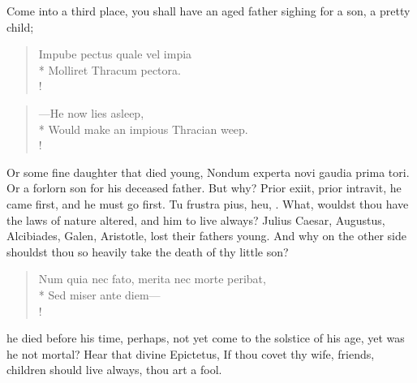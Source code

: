 {Come into a third place, you shall have an aged father sighing for a
son, a pretty child;
%
%
\begin{latin}%
\begin{verse}%
Impube pectus quale vel impia\\*
Molliret Thracum pectora.\\!
\end{verse}%
\end{latin}%
\translationrule%
\begin{verse}%
---He now lies asleep,\\*
Would make an impious Thracian weep.\\!
\end{verse}%
%
Or some fine daughter that died young, Nondum experta novi gaudia prima
tori. Or a forlorn son for his deceased father. But why? Prior exiit,
prior intravit, he came first, and he must go first. Tu frustra
pius, heu, \etc{}. What, wouldst thou have the laws of nature altered, and
him to live always? Julius Caesar, Augustus, Alcibiades, Galen,
Aristotle, lost their fathers young. And why on the other side shouldst
thou so heavily take the death of thy little son?
%
\begin{latin}%
\begin{verse}%
Num quia nec fato, merita nec morte peribat,\\*
Sed miser ante diem---\\!
\end{verse}%
\end{latin}%
%
he died before his time, perhaps, not yet come to the solstice of his
age, yet was he not mortal? Hear that divine Epictetus, If thou
covet thy wife, friends, children should live always, thou art a fool.

}
